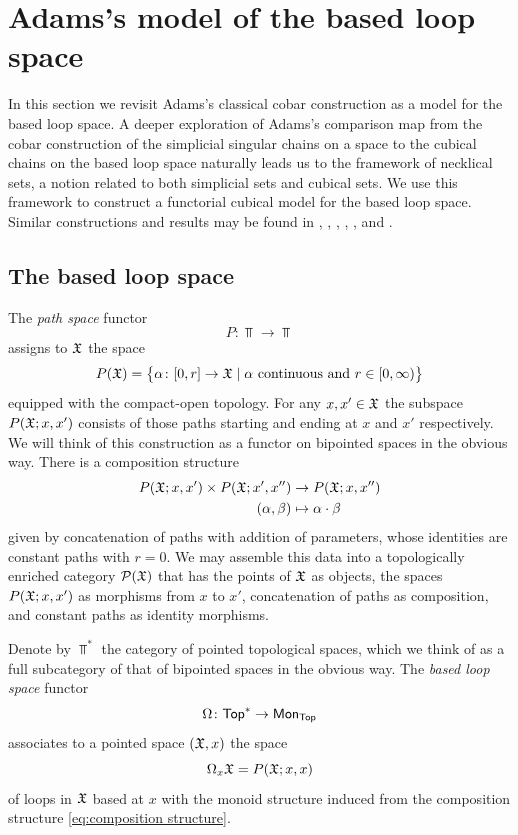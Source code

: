 
\section{Adams's model of the based loop space}\label{s:theorem1}

In this section we revisit Adams's classical cobar construction as a model for the based loop space.
A deeper exploration of Adams's comparison map from the cobar construction of the simplicial singular chains on a space to the cubical chains on the based loop space naturally leads us to the framework of necklical sets, a notion related to both simplicial sets and cubical sets.
We use this framework to construct a functorial cubical model for the based loop space.
Similar constructions and results may be found in \cite{baues1980geometry}, \cite{berger1995loops}, \cite{baues1998hopf}, \cite{dugger2011rigidification}, \cite{galvez2020hopf}, and \cite{rivera2018cubical, rivera2019path}.

\subsection{The based loop space}

The \textit{path space} functor
\[
P \colon \Top \to \Top
\]
assigns to $\mathfrak{X}$ the space
\[
P(\mathfrak{X}) = \big\{\alpha \colon [0,r] \to \mathfrak{X} \mid \text{$\alpha$ continuous and } r \in [0,\infty)\big\}
\]
equipped with the compact-open topology.
For any $x,x' \in \mathfrak{X}$ the subspace $P(\mathfrak{X};x,x')$ consists of those paths starting and ending at $x$ and $x'$ respectively.
We will think of this construction as a functor on bipointed spaces in the obvious way.
There is a composition structure
\begin{equation}\label{eq:composition structure}
	\begin{split}
		P(\mathfrak{X};x,x') \times P(\mathfrak{X};x',x'') &\to P(\mathfrak{X};x,x'') \\
		(\alpha, \beta) &\mapsto \alpha \cdot \beta
	\end{split}
\end{equation}
given by concatenation of paths with addition of parameters, whose identities are constant paths with $r=0$. We may assemble this data into a topologically enriched category $\mathcal{P}(\mathfrak{X})$ that has the points of $\mathfrak{X}$ as objects, the spaces $P(\mathfrak{X};x,x')$ as morphisms from $x$ to $x'$, concatenation of paths as composition, and constant paths as identity morphisms.

Denote by $\Top^\ast$ the category of pointed topological spaces, which we think of as a full subcategory of that of bipointed spaces in the obvious way.
The \textit{based loop space} functor
\[
\Omega \colon \mathsf{Top}^\ast \to \mathsf{Mon}_{\mathsf{Top}}
\]
associates to a pointed space $(\mathfrak{X},x)$ the space
\[
\Omega_x \mathfrak{X} = P(\mathfrak{X};x,x)
\]
of loops in $\mathfrak{X}$ based at $x$ with the monoid structure induced from the composition structure \eqref{eq:composition structure}.

